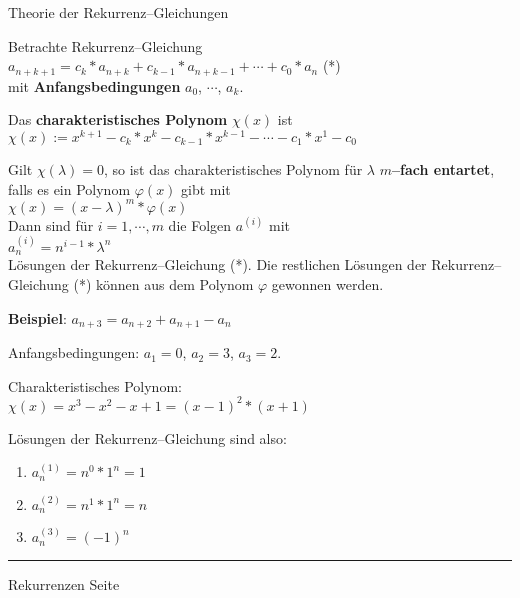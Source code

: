 

\begin{slide}{}
\normalsize

\begin{center}
Theorie der Rekurrenz--Gleichungen
\end{center}
\vspace*{0.5cm}

\footnotesize
Betrachte Rekurrenz--Gleichung \\[0.3cm]
\hspace*{0.3cm} $a_{n+k+1} = c_k * a_{n+k} + c_{k-1} * a_{n+k-1} + \cdots + c_0 * a_{n}$ \hspace*{\fill} (*)\\[0.3cm]
mit \textbf{Anfangsbedingungen} $a_0$, $\cdots$, $a_k$.

Das \textbf{charakteristisches Polynom} $\chi(x)$ ist \\[0.3cm]
\hspace*{1.3cm}  $\chi(x) := x^{k+1} - c_k * x^{k} - c_{k-1} * x^{k-1} - \cdots - c_1 * x^{1} - c_0$ 

Gilt $\chi(\lambda) = 0$, so ist das charakteristisches Polynom f\"ur $\lambda$  \textbf{$m$--fach entartet}, 
falls es ein Polynom $\varphi(x)$ gibt mit 
\\[0.3cm]
\hspace*{1.3cm} $\chi(x) = (x - \lambda)^m * \varphi(x)$ \\[0.3cm]
Dann sind   f\"ur $i=1,\cdots,m$ die Folgen $a^{(i)}$ mit   \\[0.3cm]
\hspace*{1.3cm} $a^{(i)}_n = n^{i-1} * \lambda^n$ \\[0.3cm]
L\"osungen der Rekurrenz--Gleichung (*).  Die restlichen L\"osungen der Rekurrenz--Gleichung (*) k\"onnen aus dem Polynom $\varphi$
gewonnen werden.

\textbf{Beispiel}: $a_{n+3} = a_{n+2} + a_{n+1} - a_n$

Anfangsbedingungen: $a_1 = 0$, $a_2 = 3$, $a_3 = 2$.

Charakteristisches Polynom: \\[0.3cm]
\hspace*{1.3cm} $\chi(x) = x^3 - x^2 - x + 1 = (x - 1)^2 * (x + 1)$

L\"osungen der Rekurrenz--Gleichung sind also:
\begin{enumerate}
\item $a^{(1)}_n = n^0 * 1^n = 1$
\item $a^{(2)}_n = n^1 * 1^n = n$
\item $a^{(3)}_n = (-1)^n$
\end{enumerate}





\vspace*{\fill}
\tiny \addtocounter{mypage}{1}
\rule{17cm}{1mm}
Rekurrenzen  \hspace*{\fill} Seite 
\end{slide}

